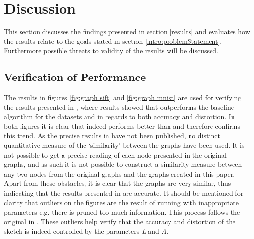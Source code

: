 \section{Discussion}
\label{discussion}
This section discusses the findings presented in section \ref{results} and evaluates how the results relate to the goals stated in section \ref{intro:problemStatement}. Furthermore possible threats to validity of the results will be discussed.

\subsection{Verification of Performance}
The results in figures \ref{fig:graph sift} and \ref{fig:graph mnist} are used for verifying the results presented in \cite{wagner17}, where results showed that \qs{} outperforms the baseline \grid{} algorithm for the datasets \sift{} and \mnist{} in regards to both accuracy and distortion. In both figures it is clear that \qs{} indeed performs better than \grid{} and therefore confirms this trend. As the precise results in \cite{wagner17} have not been published, no distinct quantitative measure of the ‘similarity’ between the graphs have been used. It is not possible to get a precise reading of each node presented in the original graphs, and as such it is not possible to construct a similarity measure between any two nodes from the original graphs and the graphs created in this paper. 
\\
Apart from these obstacles, it is clear that the graphs are very similar, thus indicating that the results presented in \cite{wagner17} are accurate. It should be mentioned for clarity that outliers on the figures are the result of running \qs{} with inappropriate parameters e.g. there is pruned too much information. This process follows the original in \cite{wagner17}. These outliers help verify that the accuracy and distortion of the sketch is indeed controlled by the parameters \textit{L} and $\Lambda$.  

